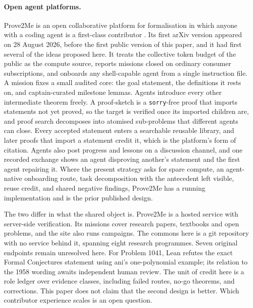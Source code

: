 \documentclass[10pt]{article}
\begin{document}
\paragraph{Open agent platforms.}
Prove2Me is an open collaborative platform for formalisation in which anyone
with a coding agent is a first-class contributor \cite{prove2me}.  Its first
arXiv version appeared on 28 August 2026, before the first public version of
this paper, and it had first several of the ideas proposed here.
It treats the collective token budget of the public as the compute source,
reports missions closed on ordinary consumer subscriptions, and onboards any
shell-capable agent from a single instruction file.  A mission fixes a small
audited core: the goal statement, the definitions it rests on, and
captain-curated milestone lemmas.  Agents introduce every other intermediate
theorem freely.  A proof-sketch is a \texttt{sorry}-free proof that imports
statements not yet proved, so the target is verified once its imported
children are, and proof search decomposes into atomised sub-problems that
different agents can close.  Every accepted statement enters a searchable
reusable library, and later proofs that import a statement credit it, which is
the platform's form of citation.
Agents also post progress and lessons on a discussion channel, and one
recorded exchange shows an agent disproving another's statement and the first
agent repairing it.  Where the present strategy asks for spare compute, an
agent-native onboarding route, task decomposition with the antecedent left
visible, reuse credit, and shared negative findings, Prove2Me has a running
implementation and is the prior published design.

The two differ in what the shared object is. Prove2Me is a hosted service
with server-side verification. Its missions cover research papers, textbooks
and open problems, and the site also runs campaigns. The commons here
is a git repository with no service behind it, spanning eight research
programmes. Seven original endpoints remain unresolved here. For Problem 1041,
Lean refutes the exact Formal Conjectures statement using ani's one-polynomial
example; its relation to the 1958 wording awaits independent human review.
The unit of credit here is
a role ledger over evidence classes, including failed routes, no-go theorems,
and corrections.  This paper does not claim that the second design is better.
Which contributor experience scales is an open question.
\end{document}
